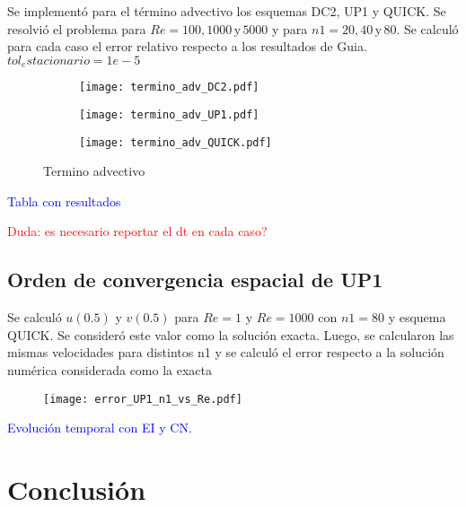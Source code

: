 \documentclass[aps,prb,twocolumn,superscriptaddress,floatfix,longbibliography,10pt]{revtex4-2}
\newcounter{para}
\begin{document}
Se implementó para el término advectivo los esquemas DC2, UP1 y QUICK. Se resolvió el problema para $Re = 100, 1000 \, \mathrm{y} \, 5000$ y para $n1 = 20, 40 \, \mathrm{y} \, 80$. Se calculó para cada caso el error relativo respecto a los resultados de Guia.
$tol_estacionario = 1e-5$

\begin{figure}
  \centering
  \begin{subfigure}[b]{0.3\textwidth}
      \centering
      \texttt{[image: termino\_adv\_DC2.pdf]}
      \caption{}
      \label{fig:termino_adv_DC2}
  \end{subfigure}
  \hfill
  \begin{subfigure}[b]{0.3\textwidth}
      \centering
      \texttt{[image: termino\_adv\_UP1.pdf]}
      \caption{}
      \label{fig:termino_adv_UP1}
  \end{subfigure}
  \hfill
  \begin{subfigure}[b]{0.3\textwidth}
      \centering
      \texttt{[image: termino\_adv\_QUICK.pdf]}
      \caption{}
      \label{fig:termino_adv_QUICK}
  \end{subfigure}
     \caption{Termino advectivo}
     \label{fig:termino_advectivo}
\end{figure}

\textcolor{blue}{Tabla con resultados}

\textcolor{red}{Duda: es necesario reportar el dt en cada caso?}

\subsection{Orden de convergencia espacial de UP1}

Se calculó $u(0.5)$ y $v(0.5)$ para $Re = 1$ y $Re = 1000$ con $n1 = 80$ y esquema QUICK. Se consideró este valor como la solución exacta. Luego, se calcularon las mismas velocidades para distintos n1 y se calculó el error respecto a la solución numérica considerada como la exacta

\begin{figure}[h]
  \texttt{[image: error\_UP1\_n1\_vs\_Re.pdf]}
  \caption{}
   \label{fig:error_UP1_n1_vs_Re}
\end{figure}


\textcolor{blue}{Evolución temporal con EI y CN.}





\section{Conclusión}


\end{document}
